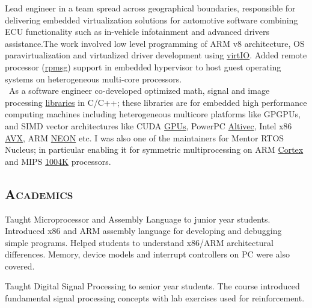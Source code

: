 \documentclass[nocolor,a4paper, colorlinks, linkcolor=true]{moderncv}
\begin{document}
{Lead engineer in a team spread across geographical boundaries, responsible for
delivering embedded virtualization solutions for automotive software combining ECU
functionality such as in-vehicle infotainment and advanced drivers assistance.The work
involved low level programming of ARM v8 architecture, OS paravirtualization and
virtualized driver development using \href{https://developer.ibm.com/technologies/linux/articles/l-virtio}{virtIO}. Added remote processor (\href{https://www.kernel.org/doc/Documentation/rpmsg.txt}{rpmsg}) support in embedded hypervisor to host guest operating systems on heterogeneous multi-core
processors. \\\ As a software engineer co-developed optimized math, signal and image processing \href{https://www.businesswire.com/news/home/20130617006661/en/AltiVec-Software-Libraries-Now-Available-for-Freescale-QorIQ-T4240-Processor}{libraries} in
C/C++; these libraries are for embedded high performance computing machines
including heterogeneous multicore platforms like GPGPUs, and SIMD vector
architectures like CUDA \href{https://developer.nvidia.com/cuda-gpus}{GPUs}, PowerPC \href{www.nxp.com/docs/en/reference-manual/ALTIVECPEM.pdf}{Altivec}, Intel x86 \href{https://www.intel.com/content/www/us/en/architecture-and-technology/avx-512-overview.html}{AVX}, ARM \href{https://www.arm.com/why-arm/technologies/neon}{NEON} etc. I was also one of the maintainers for Mentor RTOS Nucleus; in particular enabling it for symmetric multiprocessing on ARM \href{https://developer.arm.com/ip-products/processors/cortex-a/cortex-a9}{Cortex} and MIPS \href{https://s3-eu-west-1.amazonaws.com/downloads-mips/documents/MIPS32_1004K_1211.pdf}{1004K} processors.}

\subsection{\textsc{Academics}}
{Taught Microprocessor and Assembly Language to junior year students. Introduced x86 and ARM assembly language for developing and debugging simple programs. Helped
students to understand x86/ARM architectural differences. Memory, device models and interrupt controllers on PC were also covered.}

{Taught Digital Signal Processing to senior year students. The course introduced fundamental signal processing concepts with lab exercises used for reinforcement. }
\end{document}
